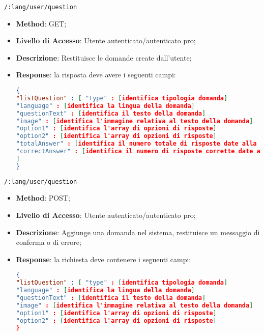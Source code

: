 \item \texttt{/:lang/user/question}
	\begin{itemize}
		\item \textbf{Method}: GET;
		\item \textbf{Livello di Accesso}: Utente autenticato/autenticato pro;
		\item \textbf{Descrizione}: Restituisce le domande create dall'utente;
		\item \textbf{Response}: la risposta deve avere i seguenti campi:
\begin{lstlisting}[language=json,firstnumber=1]
{
"listQuestion" : [ "type" : [identifica tipologia domanda]
"language" : [identifica la lingua della domanda]
"questionText" : [identifica il testo della domanda]
"image" : [identifica l'immagine relativa al testo della domanda]
"option1" : [identifica l'array di opzioni di risposte]
"option2" : [identifica l'array di opzioni di risposte]
"totalAnswer" : [identifica il numero totale di risposte date alla domanda]
"correctAnswer" : [identifica il numero di risposte corrette date alla domanda]
]
}
\end{lstlisting}
	\end{itemize}	
	
	
	\item \texttt{/:lang/user/question}
		\begin{itemize}
			\item \textbf{Method}: POST;
			\item \textbf{Livello di Accesso}: Utente autenticato/autenticato pro;
			\item \textbf{Descrizione}: Aggiunge una domanda nel sistema, restituisce un messaggio di conferma o di errore;
			\item \textbf{Response}: la richiesta deve contenere i seguenti campi:
\begin{lstlisting}[language=json,firstnumber=1]
{
"listQuestion" : [ "type" : [identifica tipologia domanda]
"language" : [identifica la lingua della domanda]
"questionText" : [identifica il testo della domanda]
"image" : [identifica l'immagine relativa al testo della domanda]
"option1" : [identifica l'array di opzioni di risposte]
"option2" : [identifica l'array di opzioni di risposte]
}
\end{lstlisting}
		\end{itemize}